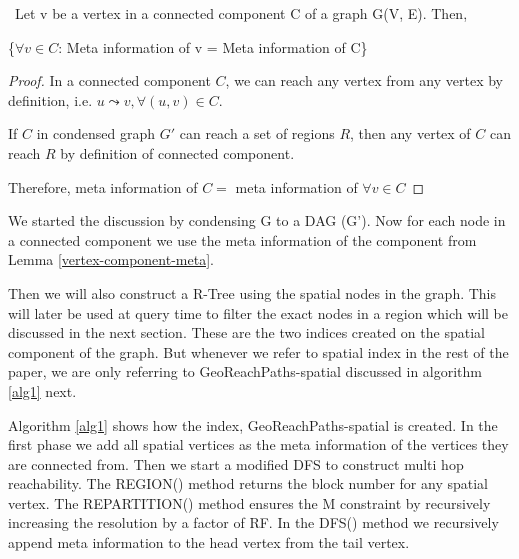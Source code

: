 {%

\begin{lemma}
\label{vertex-component-meta}
{~Let v be a vertex in a connected component C of a graph G(V, E). Then,}

{\{$\forall v \in C$: Meta information of v = Meta information of C\}}\newline
\end{lemma}

\begin{proof}
In a connected component $C$, we can reach any vertex from any vertex by definition, i.e. $u \leadsto v, \forall (u, v) \in C$. 

If $C$ in condensed graph $G'$ can reach a set of regions $R$, then any vertex of $C$ can reach $R$ by definition of connected component.

Therefore, meta information of $C =$ meta information of $\forall v \in C$
\end{proof}

We started the discussion by condensing G to a DAG (G'). Now for each node in a connected component we use the meta information of the component from Lemma \ref{vertex-component-meta}.

Then we will also construct a R-Tree using the spatial nodes in the graph. This will later be used at query time to filter the exact nodes in a region which will be discussed in the next section. These are the two indices created on the spatial component of the graph. But whenever we refer to spatial index in the rest of the paper, we are only referring to GeoReachPaths-spatial discussed in algorithm \ref{alg1} next.

Algorithm \ref{alg1} shows how the index, GeoReachPaths-spatial is created. In the first phase we add all spatial vertices as the meta information of the vertices they are connected from. Then we start a modified DFS to construct multi hop reachability. The REGION() method returns the block number for any spatial vertex. The REPARTITION() method ensures the M constraint by recursively increasing the resolution by a factor of RF. In the DFS() method we recursively append meta information to the head vertex from the tail vertex.

}
